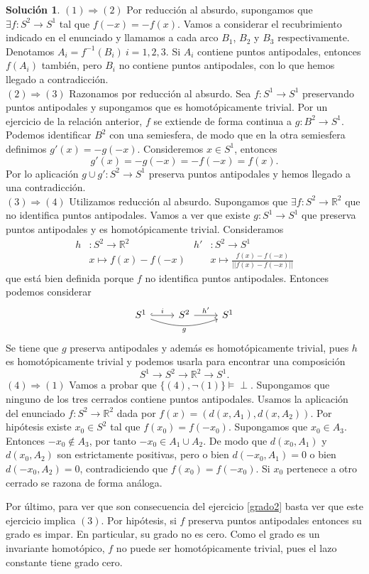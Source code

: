 \documentclass{article}
\theoremstyle{plain}
\theoremstyle{definition}
\newtheorem*{sol*}{Solución}
\newcommand{\R}{\mathbb{R}}
\begin{document}
\begin{sol*}
$\boxed{(1) \Rightarrow (2)}$ Por reducción al absurdo, supongamos que $\exists f:S^2\to S^1$ tal que $f(-x)=-f(x)$. Vamos a considerar el recubrimiento indicado en el enunciado y llamamos a cada arco $B_1$, $B_2$ y $B_3$ respectivamente. Denotamos $A_i=f^{-1}(B_i)\ i=1,2,3$. Si $A_i$ contiene puntos antipodales, entonces $f(A_i)$ también, pero $B_i$ no contiene puntos antipodales, con lo que hemos llegado a contradicción.\\
$\boxed{(2) \Rightarrow (3)}$ Razonamos por reducción al absurdo. Sea $f: S^1\to S^1$ preservando puntos antipodales y supongamos que es homotópicamente trivial. Por un ejercicio de la relación anterior, $f$ se extiende de forma continua a $g:B^2 \to S^1$. Podemos identificar $B^2$ con una semiesfera, de modo que en la otra semiesfera definimos $g'(x)=-g(-x)$. Consideremos $x\in S^1$, entonces
\[ g'(x)=-g(-x)=-f(-x)=f(x).\]
Por lo aplicación $g\cup g' :S^2\to S^1$ preserva puntos antipodales y hemos llegado a una contradicción.\\
$\boxed{(3) \Rightarrow (4)}$ Utilizamos reducción al absurdo. Supongamos que $\exists f:S^2\to\R^2$ que no identifica puntos antipodales. Vamos a ver que existe $g:S^1\to S^1$ que preserva puntos antipodales y es homotópicamente trivial. Consideramos 
\begin{align*}
h&:S^2\to\R^2 & h'&:S^2\longrightarrow S^1\\
 &x\longmapsto f(x)-f(-x) & &x\longmapsto\frac{f(x)-f(-x)}{||f(x)-f(-x)||}
\end{align*}
que está bien definida porque $f$ no identifica puntos antipodales. Entonces podemos considerar
\[
\begin{tikzcd}
S^1\arrow[r,"i",hookrightarrow]\arrow[rr,"g"', bend right=20]& S^2\arrow[r,"h'"]& S^1
\end{tikzcd}
\]
Se tiene que $g$ preserva antipodales y además es homotópicamente trivial, pues $h$ es homotópicamente trivial y podemos usarla para encontrar una composición $$S^1\to S^2\to\R^2\to S^1.$$
$\boxed{(4) \Rightarrow (1)}$ Vamos a probar que $\{(4),\neg (1)\}\models \perp$. Supongamos que ninguno de los tres cerrados contiene puntos antipodales. Usamos la aplicación del enunciado $f: S^2\to \mathbb{R}^2$ dada por $f(x) = (d(x,A_1), d(x,A_2))$. Por hipótesis existe $x_0\in S^2$ tal que $f(x_0)=f(-x_0)$. Supongamos que $x_0\in A_3$. Entonces $-x_0\notin A_3$, por tanto $-x_0\in A_1\cup A_2$. De modo que $d(x_0,A_1)$ y $d(x_0,A_2)$ son estrictamente positivas, pero o bien $d(-x_0,A_1)=0$ o bien $d(-x_0,A_2)=0$, contradiciendo que $f(x_0)=f(-x_0)$. Si $x_0$ pertenece a otro cerrado se razona de forma análoga.

Por último, para ver que son consecuencia del ejercicio \ref{grado2} basta ver que este ejercicio implica $(3)$. Por hipótesis, si $f$ preserva puntos antipodales entonces su grado es impar. En particular, su grado no es cero. Como el grado es un invariante homotópico, $f$ no puede ser homotópicamente trivial, pues el lazo constante tiene grado cero.
\end{sol*}
\end{document}
